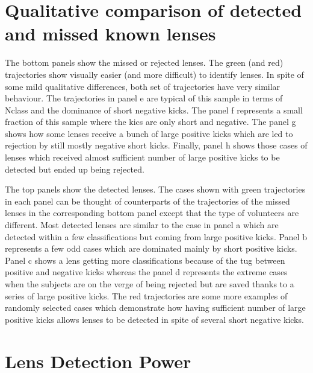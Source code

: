 \documentclass[useAMS,usenatbib,a4paper]{mn2e}
\begin{document}

\appendix

\section{Qualitative comparison of detected and missed known lenses}
\label{appendix:traj}

The bottom panels show the missed or rejected lenses. The green (and red)
trajectories show visually easier (and more difficult) to identify
lenses. In spite of some mild qualitative differences, both set of
trajectories have very similar behaviour. The trajectories in panel e
are typical of this sample in terms of Nclass and the dominance of short
negative kicks. The panel f represents a small fraction of this sample
where the kics are only short and negative. The panel g shows how some
lenses receive a bunch of large positive kicks which are led to
rejection by still mostly negative short kicks. Finally, panel h shows
those cases of lenses which received almost sufficient number of large
positive kicks to be detected but ended up being rejected.

The top panels show the detected lenses. The cases shown with green trajectories
in each panel can be thought of counterparts of the trajectories of the missed
lenses in the corresponding bottom panel except that the type of volunteers are
different. Most detected lenses are similar to the case in panel a which are
detected within a few classifications but coming from large positive kicks.
Panel b represents a few odd cases which are dominated mainly by short positive
kicks. Panel c shows a lens getting more classifications because of the tug
between positive and negative kicks whereas the panel d represents the extreme
cases when the subjects are on the verge of being rejected but are saved thanks
to a series of large positive kicks. The red trajectories are some more
examples of randomly selected cases which demonstrate how having sufficient
number of large positive kicks allows lenses to be detected in spite of several
short negative kicks.

\section{Lens Detection Power}
\label{appendix:power}
\end{document}

